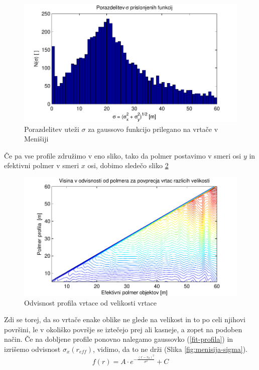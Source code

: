 \documentclass[a4paper, oneside, 12pt]{book}
\begin{document}
\begin{figure}[H]
  \begin{center}
    \includegraphics{slike/menisija-sigme-hist}
  \end{center}
  \caption{Porazdelitev uteži $\sigma$ za gaussovo funkcijo prilegano na vrtače v Menišiji}
  \label{fig:menisija-sigme-hist}
\end{figure}

Če pa vse profile združimo v eno sliko, tako da polmer postavimo v smeri osi $y$ in efektivni polmer v smeri $x$ osi, dobimo sledečo sliko \ref{fig:menisija-profil-profilov}

\begin{figure}[H]
  \centering
  \includegraphics{slike/menisija-profil-profilov}
  \caption{Odvisnost profila vrtace od velikosti vrtace}
  \label{fig:menisija-profil-profilov}
\end{figure}

Zdi se torej, da so vrtače enake oblike ne glede na velikost in to po celi njihovi površini, le v okoliško površje se iztečejo prej ali kasneje, a zopet na podoben način.
Če na dobljene profile ponovno nalegamo gaussovko (\ref{fit-profila}) in izrišemo odvisnost $\sigma_x (r_{eff})$, vidimo, da to ne drži (Slika \ref{fig:menisija-sigma}).  
\begin{equation}
  f(r) = A \cdot e^{-\frac{(r-r_0)^2}{\sigma^2}} + C  
  \label{fit-profila}
\end{equation}
\end{document}
